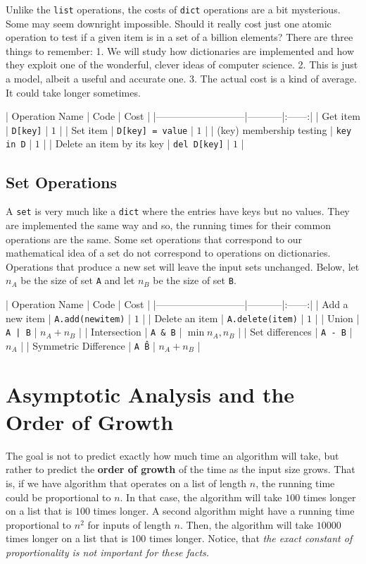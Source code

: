 Unlike the \texttt{list} operations, the costs of \texttt{dict} operations are a bit mysterious.
Some may seem downright impossible.
Should it really cost just one atomic operation to test if a given item is in a set of a billion elements?
There are three things to remember:
  1. We will study how dictionaries are implemented and how they exploit one of the wonderful, clever ideas of computer science.
  2. This is just a model, albeit a useful and accurate one.
  3. The actual cost is a kind of average.  It could take longer sometimes.


| Operation Name            | Code      | Cost |
|---------------------------|-----------|:------:|
| Get item                  | \texttt{D[key]} | $1$ |
| Set item                  | \texttt{D[key] = value} | $1$ |
| (key) membership testing  | \texttt{key in D} | $1$ |
| Delete an item by its key | \texttt{del D[key]} | $1$ |

\subsection{Set Operations}


A \texttt{set} is very much like a \texttt{dict} where the entries have keys but no values.
They are implemented the same way and so, the running times for their common operations are the same.
Some set operations that correspond to our mathematical idea of a set do not correspond to operations on dictionaries.
Operations that produce a new set will leave the input sets unchanged.
Below, let $n_A$ be the size of set \texttt{A} and let $n_B$ be the size of set \texttt{B}.


| Operation Name            | Code      | Cost |
|---------------------------|-----------|:------:|
| Add a new item            | \texttt{A.add(newitem)} | $1$ |
| Delete an item            | \texttt{A.delete(item)} | $1$ |
| Union                     | \texttt{A | B}   | $n_A + n_B$ |
| Intersection              | \texttt{A \& B}   | $\min{n_A, n_B}$ |
| Set differences           | \texttt{A - B}   | $n_A$ |
| Symmetric Difference      | \texttt{A \^ B}   | $n_A + n_B$ |

\section{Asymptotic Analysis and the Order of Growth}


The goal is not to predict exactly how much time an algorithm will take, but rather to predict the \textbf{order of growth} of the time as the input size grows.
That is, if we have algorithm that operates on a list of length $n$, the running time could be proportional to $n$.
In that case, the algorithm will take $100$ times longer on a list that is $100$ times longer.
A second algorithm might have a running time proportional to $n^2$ for inputs of length $n$.
Then, the algorithm will take $10000$ times longer on a list that is $100$ times longer.
Notice, that \emph{the exact constant of proportionality is not important for these facts.}


